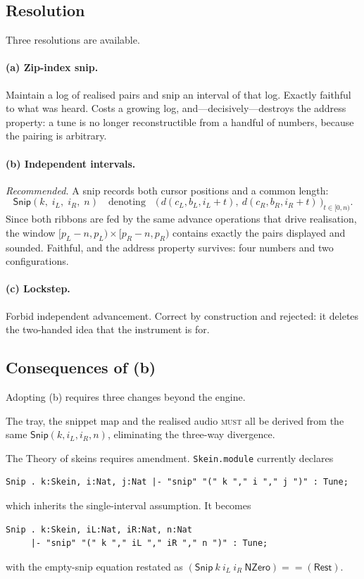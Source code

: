 \documentclass[11pt,a4paper]{article}
\newcommand{\MUST}{\textsc{must}}
\theoremstyle{definition}
\theoremstyle{plain}
\theoremstyle{remark}
\begin{document}
\subsection{Resolution}

Three resolutions are available.

\paragraph{(a) Zip-index snip.} Maintain a log of realised pairs and snip an interval of that log.
Exactly faithful to what was heard. Costs a growing log, and---decisively---destroys the address
property: a tune is no longer reconstructible from a handful of numbers, because the pairing is
arbitrary.

\paragraph{(b) Independent intervals.} \emph{Recommended.} A snip records both cursor positions and
a common length:
\[
\textsf{Snip}(k,\; i_L,\; i_R,\; n)
\quad\text{denoting}\quad
\big(\, d(c_L, b_L, i_L + t),\ d(c_R, b_R, i_R + t) \,\big)_{t \in [0, n)}.
\]
Since both ribbons are fed by the same advance operations that drive realisation, the window
$[p_L - n, p_L) \times [p_R - n, p_R)$ contains exactly the pairs displayed and sounded. Faithful,
and the address property survives: four numbers and two configurations.

\paragraph{(c) Lockstep.} Forbid independent advancement. Correct by construction and rejected: it
deletes the two-handed idea that the instrument is for.

\subsection{Consequences of (b)}

Adopting (b) requires three changes beyond the engine.

The tray, the snippet map and the realised audio \MUST{} all be derived from the same
$\textsf{Snip}(k, i_L, i_R, n)$, eliminating the three-way divergence.

The Theory of skeins requires amendment. \texttt{Skein.module} currently declares
\begin{lstlisting}
Snip . k:Skein, i:Nat, j:Nat |- "snip" "(" k "," i "," j ")" : Tune;
\end{lstlisting}
which inherits the single-interval assumption. It becomes
\begin{lstlisting}
Snip . k:Skein, iL:Nat, iR:Nat, n:Nat
     |- "snip" "(" k "," iL "," iR "," n ")" : Tune;
\end{lstlisting}
with the empty-snip equation restated as $(\textsf{Snip}\ k\ i_L\ i_R\ \textsf{NZero}) ==
(\textsf{Rest})$.
\end{document}
